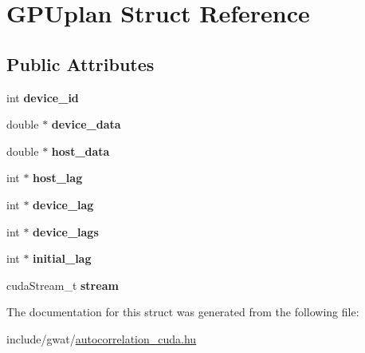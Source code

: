 \hypertarget{structGPUplan}{}\section{G\+P\+Uplan Struct Reference}
\label{structGPUplan}
\subsection*{Public Attributes}
\begin{DoxyCompactItemize}
\item 
\mbox{\label{structGPUplan_a7cc158ce31f5e5d3f06b5a71bd95a034}} 
int {\bfseries device\+\_\+id}
\item 
\mbox{\label{structGPUplan_a0622e4ecd52a4f209ad12e6f5bf7e1c0}} 
double $\ast$ {\bfseries device\+\_\+data}
\item 
\mbox{\label{structGPUplan_a00eb537157f28a6e1b0be9da32d3d7b9}} 
double $\ast$ {\bfseries host\+\_\+data}
\item 
\mbox{\label{structGPUplan_ac398a54fbf61c4bf193b970ff52867ea}} 
int $\ast$ {\bfseries host\+\_\+lag}
\item 
\mbox{\label{structGPUplan_a76a13cb6022abedf4397b15257277459}} 
int $\ast$ {\bfseries device\+\_\+lag}
\item 
\mbox{\label{structGPUplan_a994c924408e612fea29b4d97cab9b602}} 
int $\ast$ {\bfseries device\+\_\+lags}
\item 
\mbox{\label{structGPUplan_af8314128bcabaeb61e435ff7149bf2e2}} 
int $\ast$ {\bfseries initial\+\_\+lag}
\item 
\mbox{\label{structGPUplan_a5c69f5f57401823335e968f6a2f2263c}} 
cuda\+Stream\+\_\+t {\bfseries stream}
\end{DoxyCompactItemize}


The documentation for this struct was generated from the following file\+:\begin{DoxyCompactItemize}
\item 
include/gwat/\hyperlink{autocorrelation__cuda_8hu}{autocorrelation\+\_\+cuda.\+hu}\end{DoxyCompactItemize}

